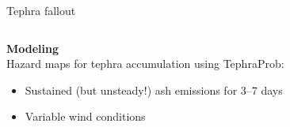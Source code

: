 \documentclass[10pt,aspectratio=169]{beamer}
\begin{document}
\begin{frame}[t]{Tephra fallout}
    \begin{columns}[T]
        \begin{column}{0.5\textwidth}	
            \textbf{Modeling} \\ \vspace*{1em} 
            Hazard maps for tephra accumulation using \alert{TephraProb}: 
            \begin{itemize}
                \item \alert{Sustained} (but \alert{unsteady}!) ash emissions for 3--7 days
                \item Variable \alert{wind conditions}
            \end{itemize}

        \end{column}
  

\end{columns}
\end{frame}
\end{document}
